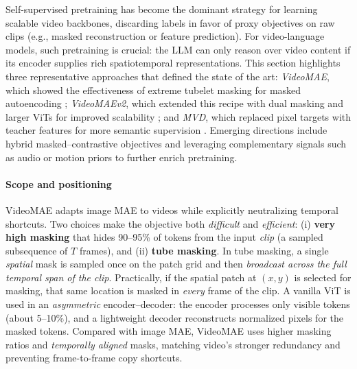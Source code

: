 \newpage
 
\begin{enrichment}
    Self-supervised pretraining has become the dominant strategy for learning scalable video backbones, discarding labels in favor of proxy objectives on raw clips (e.g., masked reconstruction or feature prediction). For video-language models, such pretraining is crucial: the LLM can only reason over video content if its encoder supplies rich spatiotemporal representations. This section highlights three representative approaches that defined the state of the art: \emph{VideoMAE}, which showed the effectiveness of extreme tubelet masking for masked autoencoding \cite{tong2022_videomae}; \emph{VideoMAEv2}, which extended this recipe with dual masking and larger ViTs for improved scalability \cite{wang2023_videomaev2}; and \emph{MVD}, which replaced pixel targets with teacher features for more semantic supervision \cite{wang2023_mvd}. Emerging directions include hybrid masked–contrastive objectives and leveraging complementary signals such as audio or motion priors to further enrich pretraining.
    
    \begin{enrichment}
        \label{enr:subsec_chapter24_videomae}
    
    \paragraph{Scope and positioning}
    VideoMAE \cite{tong2022_videomae} adapts image MAE to videos while explicitly neutralizing temporal shortcuts. Two choices make the objective both \emph{difficult} and \emph{efficient}: (i) \textbf{very high masking} that hides 90--95\% of tokens from the input \emph{clip} (a sampled subsequence of $T$ frames), and (ii) \textbf{tube masking}. In tube masking, a single \emph{spatial} mask is sampled once on the patch grid and then \emph{broadcast across the full temporal span of the clip}. Practically, if the spatial patch at $(x,y)$ is selected for masking, that same location is masked in \emph{every} frame of the clip. A vanilla ViT is used in an \emph{asymmetric} encoder--decoder: the encoder processes only visible tokens (about 5--10\%), and a lightweight decoder reconstructs normalized pixels for the masked tokens. Compared with image MAE, VideoMAE uses higher masking ratios and \emph{temporally aligned} masks, matching video’s stronger redundancy and preventing frame-to-frame copy shortcuts.
    

\end{enrichment}
\end{enrichment}
